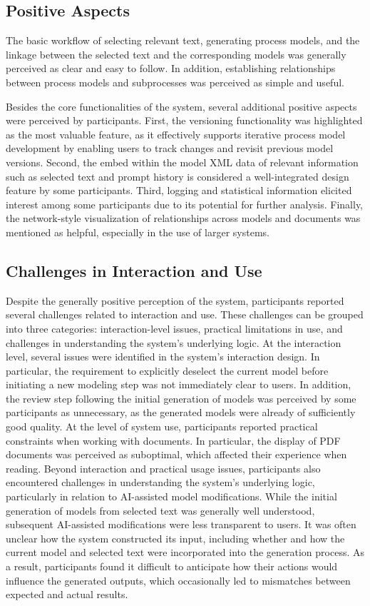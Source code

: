 \subsection{Positive Aspects}
The basic workflow of selecting relevant text, generating process models, and the linkage between the selected text and the corresponding models was generally perceived as clear and easy to follow. In addition, establishing relationships between process models and subprocesses was perceived as simple and useful.

Besides the core functionalities of the system, several additional positive aspects were perceived by participants. First, the versioning functionality was highlighted as the most valuable feature, as it effectively supports iterative process model development by enabling users to track changes and revisit previous model versions. Second, the embed within the model XML data of relevant information such as selected text and prompt history is considered a well-integrated design feature by some participants. Third, logging and statistical information elicited interest among some participants due to its potential for further analysis. Finally, the network-style visualization of relationships across models and documents was mentioned as helpful, especially in the use of larger systems.
\subsection{Challenges in Interaction and Use}
Despite the generally positive perception of the system, participants reported several challenges related to interaction and use. These challenges can be grouped into three categories: interaction-level issues, practical limitations in use, and challenges in understanding the system’s underlying logic.
At the interaction level, several issues were identified in the system’s interaction design. In particular, the requirement to explicitly deselect the current model before initiating a new modeling step was not immediately clear to users. In addition, the review step following the initial generation of models was perceived by some participants as unnecessary, as the generated models were already of sufficiently good quality.
At the level of system use, participants reported practical constraints when working with documents. In particular, the display of PDF documents was perceived as suboptimal, which affected their experience when reading. 
Beyond interaction and practical usage issues, participants also encountered challenges in understanding the system’s underlying logic, particularly in relation to AI-assisted model modifications. While the initial generation of models from selected text was generally well understood, subsequent AI-assisted modifications were less transparent to users. It was often unclear how the system constructed its input, including whether and how the current model and selected text were incorporated into the generation process. As a result, participants found it difficult to anticipate how their actions would influence the generated outputs, which occasionally led to mismatches between expected and actual results. 

